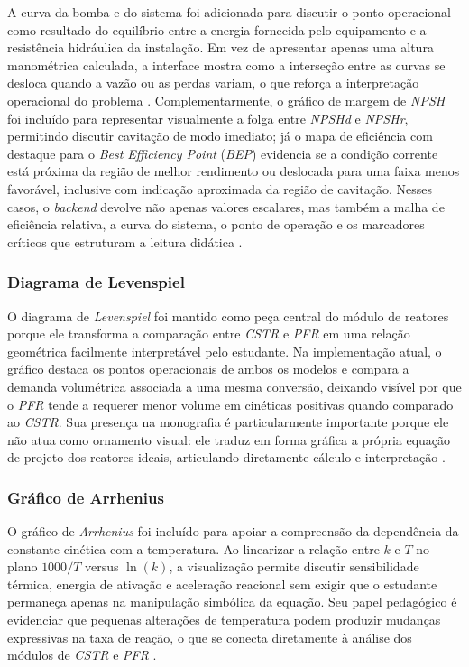 A curva da bomba e do sistema foi adicionada para discutir o ponto operacional como resultado do equilíbrio entre a energia fornecida pelo equipamento e a resistência hidráulica da instalação. Em vez de apresentar apenas uma altura manométrica calculada, a interface mostra como a interseção entre as curvas se desloca quando a vazão ou as perdas variam, o que reforça a interpretação operacional do problema \cite{fox2011}. Complementarmente, o gráfico de margem de \textit{NPSH} foi incluído para representar visualmente a folga entre \textit{NPSHd} e \textit{NPSHr}, permitindo discutir cavitação de modo imediato; já o mapa de eficiência com destaque para o \textit{Best Efficiency Point} (\textit{BEP}) evidencia se a condição corrente está próxima da região de melhor rendimento ou deslocada para uma faixa menos favorável, inclusive com indicação aproximada da região de cavitação. Nesses casos, o \textit{backend} devolve não apenas valores escalares, mas também a malha de eficiência relativa, a curva do sistema, o ponto de operação e os marcadores críticos que estruturam a leitura didática \cite{karassik2008,fox2011}.

\subsubsection{Diagrama de Levenspiel}

O diagrama de \textit{Levenspiel} foi mantido como peça central do módulo de reatores porque ele transforma a comparação entre \textit{CSTR} e \textit{PFR} em uma relação geométrica facilmente interpretável pelo estudante. Na implementação atual, o gráfico destaca os pontos operacionais de ambos os modelos e compara a demanda volumétrica associada a uma mesma conversão, deixando visível por que o \textit{PFR} tende a requerer menor volume em cinéticas positivas quando comparado ao \textit{CSTR}. Sua presença na monografia é particularmente importante porque ele não atua como ornamento visual: ele traduz em forma gráfica a própria equação de projeto dos reatores ideais, articulando diretamente cálculo e interpretação \cite{levenspiel2000,fogler2009}.

\subsubsection{Gráfico de Arrhenius}

O gráfico de \textit{Arrhenius} foi incluído para apoiar a compreensão da dependência da constante cinética com a temperatura. Ao linearizar a relação entre $k$ e $T$ no plano $1000/T$ versus $\ln(k)$, a visualização permite discutir sensibilidade térmica, energia de ativação e aceleração reacional sem exigir que o estudante permaneça apenas na manipulação simbólica da equação. Seu papel pedagógico é evidenciar que pequenas alterações de temperatura podem produzir mudanças expressivas na taxa de reação, o que se conecta diretamente à análise dos módulos de \textit{CSTR} e \textit{PFR} \cite{fogler2009}.

